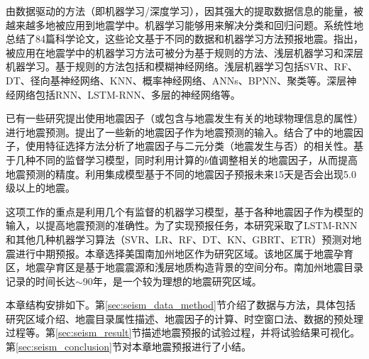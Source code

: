 由数据驱动的方法（即机器学习/深度学习），因其强大的提取数据信息的能量，被越来越多地被应用到地震学中\citep{Alves2006Earthquake,Madahizadeh2009prediction,Panakkat2007Neural,Sunkara2009Model}。机器学习能够用来解决分类和回归问题。\citet{al2020application}系统性地总结了84篇科学论文，这些论文基于不同的数据和机器学习方法预报地震。\citet{al2020application}指出，被应用在地震学中的机器学习方法可被分为基于规则的方法、浅层机器学习和深层机器学习。基于规则的方法包括\citep{zhong2010prediction,zamani2013application,mirrashid2014earthquake}和模糊神经网络\citep{Lopez2019Evolutionary}。浅层机器学习包括SVR\citep{asencio2017temporal}、RF\citep{asim2017earthquake}、DT\citep{asencio2017temporal}、径向基神经网络\citep{Alexandridis2014Large}、KNN\citep{Panakkat2007Neural,asencio2017temporal}、概率神经网络\citep{Adeli2009A}、ANNs\citep{morales2013earthquake,asencio2017temporal}、BPNN\citep{Panakkat2007Neural,Narayanakumar2016A}、聚类\citep{shodiq2018neural}等。深层神经网络包括RNN\citep{Panakkat2009Recurrent,asim2017earthquake}、LSTM-RNN\citep{Wang2017Earthquake,Bhatia2018EARTHQUAKE,berhich2020lstm}、多层的神经网络\citep{huang2018large}等。

已有一些研究提出使用地震因子（或包含与地震发生有关的地球物理信息的属性）进行地震预测\citep{Panakkat2007Neural,martinez2013determining,reyes2013neural,morales2013earthquake,asencio2016sensitivity}。\citet{reyes2013neural}提出了一些新的地震因子作为地震预测的输入。\citet{martinez2013determining}结合了\citet{Panakkat2007Neural}中的地震因子，使用特征选择方法分析了地震因子与二元分类（地震发生与否）的相关性。\citet{asencio2016sensitivity}基于几种不同的监督学习模型，同时利用计算的$b$值调整相关的地震因子，从而提高地震预测的精度。\citet{asim2018seismic}利用集成模型基于不同的地震因子预报未来15天是否会出现5.0级以上的地震。

这项工作的重点是利用几个有监督的机器学习模型，基于各种地震因子作为模型的输入，以提高地震预测的准确性。为了实现预报任务，本研究采取了LSTM-RNN\citep{Wang2017Earthquake,Bhatia2018EARTHQUAKE,berhich2020lstm}和其他几种机器学习算法（SVR、LR、RF、DT、KN、GBRT、ETR）预测对地震进行中期预报。本章选择美国南加州地区作为研究区域。该地区属于地震孕育区，地震孕育区是基于地震震源和浅层地质构造背景的空间分布。南加州地震目录记录的时间长达$\sim$90年，是一个较为理想的地震研究区域。

本章结构安排如下。第\ref{sec:seism_data_method}节介绍了数据与方法，具体包括研究区域介绍、地震目录属性描述、地震因子的计算、时空窗口法、数据的预处理过程等。第\ref{sec:seism_result}节描述地震预报的试验过程，并将试验结果可视化。第\ref{sec:seism_conclusion}节对本章地震预报进行了小结。

